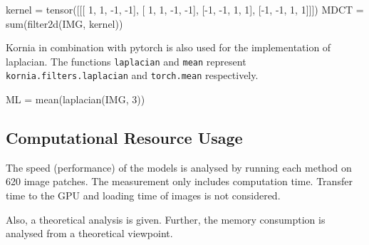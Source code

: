 \begin{python}
kernel = tensor([[[ 1,  1, -1, -1],
                  [ 1,  1, -1, -1],
                  [-1, -1,  1,  1],
                  [-1, -1,  1,  1]]])
MDCT = sum(filter2d(IMG, kernel))
\end{python}

Kornia in combination with pytorch is also used for the implementation of \ac{laplacian}. The functions \texttt{laplacian} and \texttt{mean} represent \texttt{kornia.filters.laplacian} and \texttt{torch.mean} respectively.

\begin{python}
ML = mean(laplacian(IMG, 3))
\end{python}

\subsection{Computational Resource Usage}
\label{sec:Methods:Evaluation:Computation}

The speed (performance) of the models is analysed by running each method on 620 image patches. The measurement only includes computation time. Transfer time to the GPU and loading time of images is not considered.

Also, a theoretical analysis is given. Further, the memory consumption is analysed from a theoretical viewpoint. 

